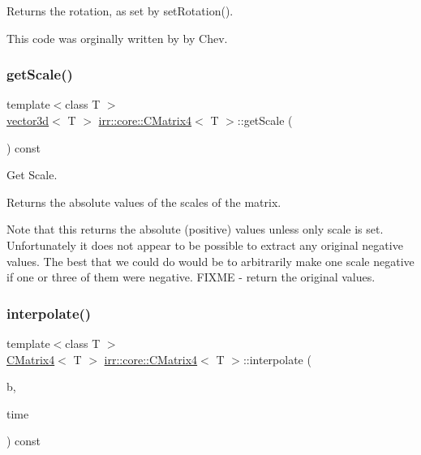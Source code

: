 Returns the rotation, as set by set\+Rotation(). 

This code was orginally written by by Chev. \mbox{\label{classirr_1_1core_1_1CMatrix4_a27801e0cb2d3ce458f66ff7cfbe13544}} 
\subsubsection{\texorpdfstring{get\+Scale()}{getScale()}}
{\footnotesize\ttfamily template$<$class T $>$ \\
\hyperlink{classirr_1_1core_1_1vector3d}{vector3d}$<$ T $>$ \hyperlink{classirr_1_1core_1_1CMatrix4}{irr\+::core\+::\+C\+Matrix4}$<$ T $>$\+::get\+Scale (\begin{DoxyParamCaption}{ }\end{DoxyParamCaption}) const\hspace{0.3cm}{\ttfamily [inline]}}



Get Scale. 

Returns the absolute values of the scales of the matrix.

Note that this returns the absolute (positive) values unless only scale is set. Unfortunately it does not appear to be possible to extract any original negative values. The best that we could do would be to arbitrarily make one scale negative if one or three of them were negative. F\+I\+X\+ME -\/ return the original values. \mbox{\label{classirr_1_1core_1_1CMatrix4_a374a0f1c43c8c8ba78317c9c59590ad1}} 
\subsubsection{\texorpdfstring{interpolate()}{interpolate()}\hspace{0.1cm}{\footnotesize\ttfamily [1/2]}}
{\footnotesize\ttfamily template$<$class T $>$ \\
\hyperlink{classirr_1_1core_1_1CMatrix4}{C\+Matrix4}$<$ T $>$ \hyperlink{classirr_1_1core_1_1CMatrix4}{irr\+::core\+::\+C\+Matrix4}$<$ T $>$\+::interpolate (\begin{DoxyParamCaption}\item[{const \hyperlink{classirr_1_1core_1_1CMatrix4}{core\+::\+C\+Matrix4}$<$ T $>$ \&}]{b,  }\item[{\hyperlink{namespaceirr_a0277be98d67dc26ff93b1a6a1d086b07}{f32}}]{time }\end{DoxyParamCaption}) const\hspace{0.3cm}{\ttfamily [inline]}}



